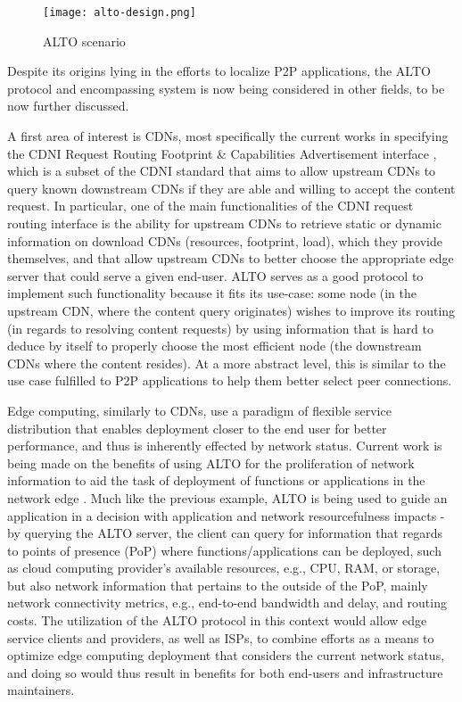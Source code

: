     \begin{figure}[!h]
    \centering
    \texttt{[image: alto-design.png]}
    \caption{ALTO scenario \cite{seedorf2009}}
    \label{fig:alto-design}
    \end{figure}

    Despite its origins lying in the efforts to localize P2P applications, the ALTO protocol and encompassing system is now being considered in other fields, to be now further discussed.

    A first area of interest is CDNs, most specifically the current works in specifying the CDNI Request Routing Footprint \& Capabilities Advertisement interface \cite{alto-cdni(draft)}, which is a subset of the CDNI standard \cite{cdni-problem-statement} that aims to allow upstream CDNs to query known downstream CDNs if they are able and willing to accept the content request.
    In particular, one of the main functionalities of the CDNI request routing interface is the ability for upstream CDNs to retrieve static or dynamic information on download CDNs (resources, footprint, load), which they provide themselves, and that allow upstream CDNs to better choose the appropriate edge server that could serve a given end-user.
    ALTO serves as a good protocol to implement such functionality because it fits its use-case: some node (in the upstream CDN, where the content query originates) wishes to improve its routing (in regards to resolving content requests) by using information that is hard to deduce by itself to properly choose the most efficient node (the downstream CDNs where the content resides).
    At a more abstract level, this is similar to the use case fulfilled to P2P applications to help them better select peer connections.

    Edge computing, similarly to CDNs, use a paradigm of flexible service distribution that enables deployment closer to the end user for better performance, and thus is inherently effected by network status.
    Current work is being made on the benefits of using ALTO for the proliferation of network information to aid the task of deployment of functions or applications in the network edge \cite{alto-determining-service-edge(draft)}.
    Much like the previous example, ALTO is being used to guide an application in a decision with application and network resourcefulness impacts - by querying the ALTO server, the client can query for information that regards to points of presence (PoP) where functions/applications can be deployed, such as cloud computing provider's available resources, e.g., CPU, RAM, or storage, but also network information that pertains to the outside of the PoP, mainly network connectivity metrics, e.g., end-to-end bandwidth and delay, and routing costs.
    The utilization of the ALTO protocol in this context would allow edge service clients and providers, as well as ISPs, to combine efforts as a means to optimize edge computing deployment that considers the current network status, and doing so would thus result in benefits for both end-users and infrastructure maintainers.

